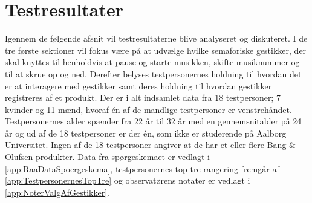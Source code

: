 \chapter{Testresultater}
\label{Testresultater}
%
Igennem de følgende afsnit vil testresultaterne blive analyseret og diskuteret. I de tre første sektioner vil fokus være på at udvælge hvilke semaforiske gestikker, der skal knyttes til henholdvis at pause og starte musikken, skifte musiknummer og til at skrue op og ned. Derefter belyses testpersonernes holdning til hvordan det er at interagere med gestikker samt deres holdning til hvordan gestikker registreres af et produkt.\blankline
%
Der er i alt indsamlet data fra 18 testpersoner; 7 kvinder og 11 mænd, hvoraf én af de mandlige testpersoner er venstrehåndet. Testpersonernes alder spænder fra 22 år til 32 år med en gennemsnitalder på 24 år og ud af de 18 testpersoner er der én, som ikke er studerende på Aalborg Universitet. Ingen af de 18 testpersoner angiver at de har et eller flere Bang $\&$ Olufsen produkter. Data fra spørgeskemaet er vedlagt i \autoref{app:RaaDataSpoergeskema}, testpersonernes top tre rangering fremgår af \autoref{app:TestpersonernesTopTre} og observatørens notater er vedlagt i \autoref{app:NoterValgAfGestikker}.     